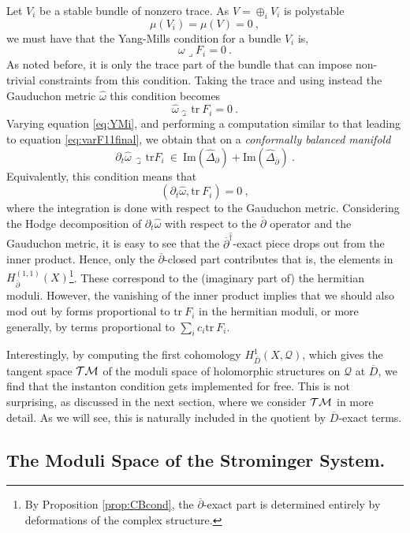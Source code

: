 \documentclass[12pt,a4paper]{article}
\def\bar#1{\overline{#1}}
\let\p=\partial
\def\bp{\bar{\partial}}
\def\tr{\textrm{tr}}
\def\Q{\mathcal{Q}}
\theoremstyle{definition}
\begin{document}
Let $V_i$ be a stable bundle of nonzero trace. As $V=\oplus_i V_i$ is polystable 
\[\mu(V_i) = \mu(V) = 0~, \]
we must have that the Yang-Mills condition for a bundle $V_i$ is,
\begin{equation*}
\omega\lrcorner F_i=0\:.
\end{equation*}
As noted before, it is only the trace part of the bundle that can impose non-trivial constraints from this condition. Taking the trace and using instead the Gauduchon metric $\hat\omega$ this condition becomes
\begin{equation}
\label{eq:YMi}
\hat\omega\hat\lrcorner\,\tr\:F_i=0\:.
\end{equation} 
Varying equation \eqref{eq:YMi}, and performing a computation similar to that leading to equation \eqref{eq:varF11final}, we obtain that on a {\it conformally balanced manifold}
\begin{equation*}
\p_t\hat\omega\,\hat\lrcorner\,\tr F_i\:\in\:\textrm{Im}(\widehat\Delta_\p)+\textrm{Im}(\widehat\Delta_{\bp})\:.
\end{equation*}
Equivalently, this condition means that
\begin{equation*}
(\p_t\hat\omega,\tr\:F_i) = 0\:,
\end{equation*}
where the integration is done with respect to the Gauduchon metric. Considering the Hodge decomposition of $\p_t\hat\omega$ with respect to the $\bp$ operator and the Gauduchon metric, it is easy to see that the $\bp^{\hat\dagger}$-exact piece  drops out from the inner product.  Hence, only the $\bp$-closed part contributes that is,  the elements in $H_{\bp}^{(1,1)}(X)$\footnote{By Proposition \ref{prop:CBcond}, the $\bp$-exact part is determined entirely by deformations of the complex structure.}.  These correspond to the (imaginary part of) the hermitian moduli.  However, the vanishing of the inner product implies that we should also mod out by forms proportional to $\tr\:F_i$ in the hermitian moduli, or more generally, by terms proportional to $\sum_ic_i\tr\:F_i$. 

Interestingly, by computing the first cohomology $H^1_{\bar D}(X,\Q)$, which gives the tangent space $\cal TM$ of the moduli space of holomorphic structures on $\Q$ at $\bar D$, we find that the instanton condition gets implemented for free. This is not surprising, as discussed in the next section, where we consider $\cal TM$  in more detail. As we will see, this is naturally included in the quotient by $\bar D$-exact terms.

\subsection{The Moduli Space of the Strominger System.}
\end{document}
